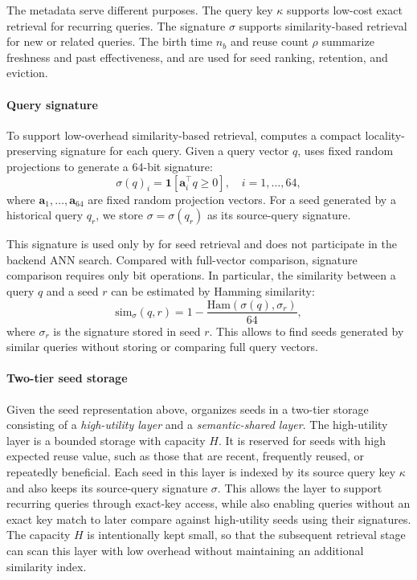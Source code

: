 The metadata serve different purposes.
The query key $\kappa$ supports low-cost exact retrieval for recurring queries.
The signature $\sigma$ supports similarity-based retrieval for new or related queries.
The birth time $n_b$ and reuse count $\rho$ summarize freshness and past effectiveness, and are used for seed ranking, retention, and eviction.

\paragraph{Query signature}
To support low-overhead similarity-based retrieval, \system computes a compact locality-preserving signature for each query.
Given a query vector $q$, \system uses fixed random projections to generate a 64-bit signature:
\begin{equation}
\sigma(q)_i=\mathbf{1}[\mathbf{a}_i^\top q \ge 0],
\quad i=1,\ldots,64,
\end{equation}
where $\mathbf{a}_1,\ldots,\mathbf{a}_{64}$ are fixed random projection vectors.
For a seed generated by a historical query $q_r$, we store $\sigma=\sigma(q_r)$ as its source-query signature.

This signature is used only by \system for seed retrieval and does not participate in the backend ANN search.
Compared with full-vector comparison, signature comparison requires only bit operations.
In particular, the similarity between a query $q$ and a seed $r$ can be estimated by Hamming similarity:
\begin{equation}
\mathrm{sim}_{\sigma}(q,r)
=
1-\frac{\mathrm{Ham}(\sigma(q),\sigma_r)}{64},
\label{eq:Ham}
\end{equation}
where $\sigma_r$ is the signature stored in seed $r$.
This allows \system to find seeds generated by similar queries without storing or comparing full query vectors.


\paragraph{Two-tier seed storage}
Given the seed representation above, \system organizes seeds in a two-tier storage consisting of a \textit{high-utility layer} and a \textit{semantic-shared layer}.
The high-utility layer is a bounded storage with capacity $H$. It is reserved for seeds with high expected reuse value, such as those that are recent, frequently reused, or repeatedly beneficial.
Each seed in this layer is indexed by its source query key $\kappa$ and also keeps its source-query signature $\sigma$.
This allows the layer to support recurring queries through exact-key access, while also enabling queries without an exact key match to later compare against high-utility seeds using their signatures.
The capacity $H$ is intentionally kept small, so that the subsequent retrieval stage can scan this layer with low overhead without maintaining an additional similarity index.


